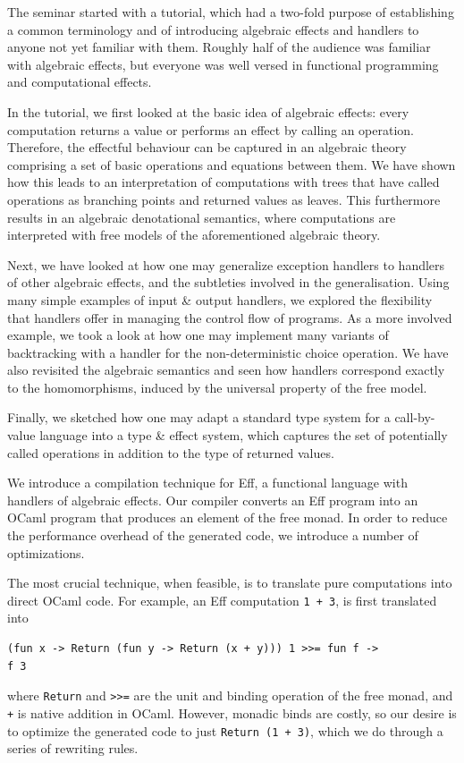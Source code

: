 \documentclass[a4paper,UKenglish]{dagrep}
\begin{document}
The seminar started with a tutorial, which had a two-fold purpose of establishing a common terminology and of introducing algebraic effects and handlers to anyone not yet familiar with them. Roughly half of the audience was familiar with algebraic effects, but everyone was well versed in functional programming and computational effects.

In the tutorial, we first looked at the basic idea of algebraic effects: every computation returns a value or performs an effect by calling an operation. Therefore, the effectful behaviour can be captured in an algebraic theory comprising a set of basic operations and equations between them. We have shown how this leads to an interpretation of computations with trees that have called operations as branching points and returned values as leaves. This furthermore results in an algebraic denotational semantics, where computations are interpreted with free models of the aforementioned algebraic theory.

Next, we have looked at how one may generalize exception handlers to handlers of other algebraic effects, and the subtleties involved in the generalisation. Using many simple examples of input \& output handlers, we explored the flexibility that handlers offer in managing the control flow of programs. As a more involved example, we took a look at how one may implement many variants of backtracking with a handler for the non-deterministic choice operation. We have also revisited the algebraic semantics and seen how handlers correspond exactly to the homomorphisms, induced by the universal property of the free model.

Finally, we sketched how one may adapt a standard type system for a call-by-value language into a type \& effect system, which captures the set of potentially called operations in addition to the type of returned values.

\license

We introduce a compilation technique for Eff, a functional language with handlers of algebraic effects. Our compiler converts an Eff program into an OCaml program that produces an element of the free monad. In order to reduce the performance overhead of the generated code, we introduce a number of optimizations.

The most crucial technique, when feasible, is to translate pure computations into direct OCaml code. For example, an Eff computation \verb|1 + 3|, is first translated into
\begin{verbatim}
(fun x -> Return (fun y -> Return (x + y))) 1 >>= fun f ->
f 3
\end{verbatim}
where \verb|Return| and \verb|>>=| are the unit and binding operation of the free monad, and \verb|+| is native addition in OCaml.
However, monadic binds are costly, so our desire is to optimize the generated code to just \verb|Return (1 + 3)|, which we do through a series of rewriting rules.
\end{document}
